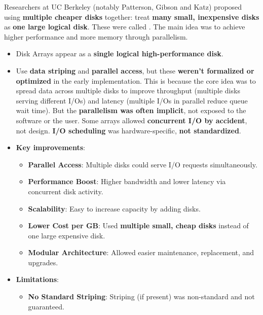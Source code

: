 \highspace
Researchers at UC Berkeley (notably Patterson, Gibson and Katz) proposed using \textbf{multiple cheaper disks} together: treat \textbf{many small, inexpensive disks} as \textbf{one large logical disk}. These were called . The main idea was to achieve higher performance and more memory through parallelism.
\begin{itemize}
    \item Disk Arrays appear as a \textbf{single logical high-performance disk}.
    \item Use \textbf{data striping} and \textbf{parallel access}, but these \textbf{weren't formalized or optimized} in the early implementation. This is because the core idea was to spread data across multiple disks to improve throughput (multiple disks serving different I/Os) and latency (multiple I/Os in parallel reduce queue wait time). But the \textbf{parallelism was often implicit}, not exposed to the software or the user. Some arrays allowed \textbf{concurrent I/O by accident}, not design. \textbf{I/O scheduling} was hardware-specific, \textbf{not standardized}.
    \item[\textcolor{Green3}{\faIcon{check-circle}}] \textcolor{Green3}{\textbf{Key improvements}}:
    \begin{itemize}[label=\textcolor{Green3}{}]
        \item \textcolor{Green3}{\textbf{Parallel Access}}: Multiple disks could serve I/O requests simultaneously.
        \item \textcolor{Green3}{\textbf{Performance Boost}}: Higher bandwidth and lower latency via concurrent disk activity.
        \item \textcolor{Green3}{\textbf{Scalability}}: Easy to increase capacity by adding disks.
        \item \textcolor{Green3}{\textbf{Lower Cost per GB}}: Used \textbf{multiple small, cheap disks} instead of one large expensive disk.
        \item \textcolor{Green3}{\textbf{Modular Architecture}}: Allowed easier maintenance, replacement, and upgrades.
    \end{itemize}
    \item[\textcolor{Red2}{\faIcon{times-circle}}] \textcolor{Red2}{\textbf{Limitations}}:
    \begin{itemize}[label=\textcolor{Red2}{}]
        \item \textcolor{Red2}{\textbf{No Standard Striping}}: Striping (if present) was non-standard and not guaranteed.

\end{itemize}
\end{itemize}
